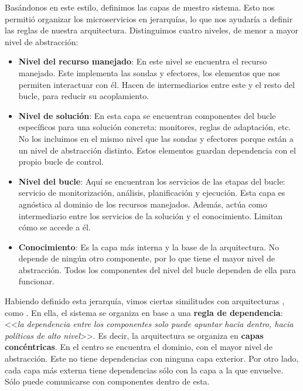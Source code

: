 Basándonos en este estilo, definimos las capas de nuestro sistema. Esto nos permitió organizar los microservicios en jerarquías, lo que nos ayudaría a definir las reglas de nuestra arquitectura. Distinguimos cuatro niveles, de menor a mayor nivel de abstracción:

\begin{itemize}
  \item \textbf{Nivel del recurso manejado}: En este nivel se encuentra el recurso manejado. Este implementa las sondas y efectores, los elementos que nos permiten interactuar con él. Hacen de intermediarios entre este y el resto del bucle, para reducir su acoplamiento.

  \item \textbf{Nivel de solución}: En esta capa se encuentran componentes del bucle específicos para una solución concreta: monitores, reglas de adaptación, etc. No los incluimos en el mismo nivel que las sondas y efectores porque están a un nivel de abstracción distinto. Estos elementos guardan dependencia con el propio bucle de control.

  \item \textbf{Nivel del bucle}: Aquí se encuentran los servicios de las etapas del bucle: servicio de monitorización, análisis, planificación y ejecución. Esta capa es agnóstica al dominio de los recursos manejados. Además, actúa como intermediario entre los servicios de la solución y el conocimiento. Limitan cómo se accede a él.

  \item \textbf{Conocimiento}: Es la capa más interna y la base de la arquitectura. No depende de ningún otro componente, por lo que tiene el mayor nivel de abstracción. Todos los componentes del nivel del bucle dependen de ella para funcionar.

\end{itemize}

Habiendo definido esta jerarquía, vimos ciertas similitudes con arquitecturas , como . \cite{martinChapter22Clean2018a} En ella, el sistema se organiza en base a una \textbf{regla de dependencia}: <<\emph{la dependencia entre los componentes solo puede apuntar hacia dentro, hacia políticas de alto nivel}>>. Es decir, la arquitectura se organiza en \textbf{capas concéntricas}. En el centro se encuentra el dominio, con el mayor nivel de abstracción. Este no tiene dependencias con ninguna capa exterior. Por otro lado, cada capa más externa tiene dependencias sólo con la capa a la que envuelve. Sólo puede comunicarse con componentes dentro de esta.

